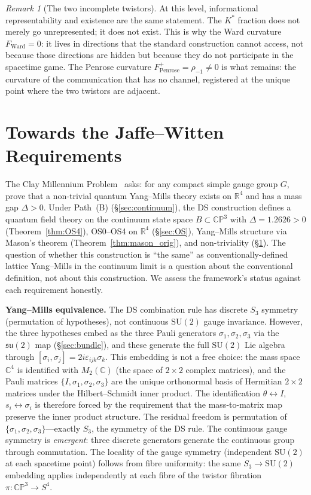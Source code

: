 \documentclass[11pt,a4paper]{article}
\theoremstyle{definition}
\theoremstyle{remark}
\newtheorem{remark}[theorem]{Remark}
\newcommand{\CP}{\mathbb{CP}}
\newcommand{\C}{\mathbb{C}}
\newcommand{\R}{\mathbb{R}}
\newcommand{\SU}{\mathrm{SU}}
\newcommand{\su}{\mathfrak{su}}
\begin{document}
\begin{remark}[The two incomplete twistors]
At this level, informational representability and existence are the same statement. The $K^*$ fraction does not merely go unrepresented; it does not exist. This is why the Ward curvature $F_\mathrm{Ward}=0$: it lives in directions that the standard construction cannot access, not because those directions are hidden but because they do not participate in the spacetime game. The Penrose curvature $F^+_\mathrm{Penrose}=\rho_{-1}\neq 0$ is what remains: the curvature of the communication that has no channel, registered at the unique point where the two twistors are adjacent.
\end{remark}


\section{Towards the Jaffe--Witten Requirements}\label{sec:JW}

The Clay Millennium Problem~\cite{JW2000} asks: for any compact simple gauge group $G$, prove that a non-trivial quantum Yang--Mills theory exists on $\R^4$ and has a mass gap $\Delta>0$. Under Path~(B) (\S\ref{sec:continuum}), the DS construction defines a quantum field theory on the continuum state space $B\subset\CP^3$ with $\Delta=1.2626>0$ (Theorem~\ref{thm:OS4}), OS0--OS4 on $\R^4$ (\S\ref{sec:OS}), Yang--Mills structure via Mason's theorem (Theorem~\ref{thm:mason_orig}), and non-triviality (\S\ref{sec:JW}). The question of whether this construction is ``the same'' as conventionally-defined lattice Yang--Mills in the continuum limit is a question about the conventional definition, not about this construction. We assess the framework's status against each requirement honestly.

\textbf{Yang--Mills equivalence.} The DS combination rule has discrete $S_3$ symmetry (permutation of hypotheses), not continuous $\SU(2)$ gauge invariance. However, the three hypotheses embed as the three Pauli generators $\sigma_1,\sigma_2,\sigma_3$ via the $\su(2)$ map (\S\ref{sec:bundle}), and these generate the full $\SU(2)$ Lie algebra through $[\sigma_i,\sigma_j]=2i\varepsilon_{ijk}\sigma_k$. This embedding is not a free choice: the mass space $\C^4$ is identified with $M_2(\C)$ (the space of $2\times 2$ complex matrices), and the Pauli matrices $\{I,\sigma_1,\sigma_2,\sigma_3\}$ are the unique orthonormal basis of Hermitian $2\times 2$ matrices under the Hilbert--Schmidt inner product. The identification $\theta\leftrightarrow I$, $s_i\leftrightarrow\sigma_i$ is therefore forced by the requirement that the mass-to-matrix map preserve the inner product structure. The residual freedom is permutation of $\{\sigma_1,\sigma_2,\sigma_3\}$---exactly $S_3$, the symmetry of the DS rule. The continuous gauge symmetry is \emph{emergent}: three discrete generators generate the continuous group through commutation. The locality of the gauge symmetry (independent $\SU(2)$ at each spacetime point) follows from fibre uniformity: the same $S_3\to\SU(2)$ embedding applies independently at each fibre of the twistor fibration $\pi:\CP^3\to S^4$.
\end{document}

